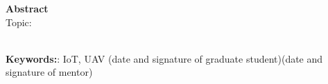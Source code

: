 \newpage
\begin{center}
 {\large\bf Abstract} \\
\vskip 1cm
Topic:\\
\textit{\bf }\\
\end{center}
\vskip 1cm
\noindent
\textbf{Keywords:}: IoT, UAV
\vskip 2cm
\noindent
(date and signature of graduate student)\hfill (date and signature of mentor)
